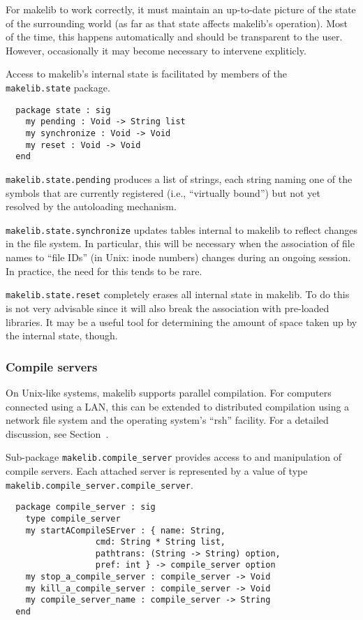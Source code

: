 For makelib to work correctly, it must maintain an up-to-date picture of
the state of the surrounding world (as far as that state affects makelib's
operation).  Most of the time, this happens automatically and should be
transparent to the user.  However, occasionally it may become
necessary to intervene expliticly.

Access to makelib's internal state is facilitated by members of the {\tt
makelib.state} package.

\begin{verbatim}
  package state : sig
    my pending : Void -> String list
    my synchronize : Void -> Void
    my reset : Void -> Void
  end
\end{verbatim}

{\tt makelib.state.pending} produces a list of strings, each string naming
one of the symbols that are currently registered (i.e., ``virtually
bound'') but not yet resolved by the autoloading mechanism.

{\tt makelib.state.synchronize} updates tables internal to makelib to reflect
changes in the file system.  In particular, this will be necessary
when the association of file names to ``file IDs'' (in Unix: inode
numbers) changes during an ongoing session.  In practice, the need for
this tends to be rare.

{\tt makelib.state.reset} completely erases all internal state in makelib.  To
do this is not very advisable since it will also break the association
with pre-loaded libraries.  It may be a useful tool for determining
the amount of space taken up by the internal state, though.

\subsubsection{Compile servers}

On Unix-like systems, makelib supports parallel compilation.  For computers
connected using a LAN, this can be extended to distributed compilation
using a network file system and the operating system's ``rsh''
facility.  For a detailed discussion, see Section~.

Sub-package {\tt makelib.compile_server} provides access to and manipulation
of compile servers.  Each attached server is represented by a value of
type {\tt makelib.compile_server.compile_server}.

\begin{verbatim}
  package compile_server : sig
    type compile_server
    my startACompileSErver : { name: String,
                  cmd: String * String list,
                  pathtrans: (String -> String) option,
                  pref: int } -> compile_server option
    my stop_a_compile_server : compile_server -> Void
    my kill_a_compile_server : compile_server -> Void
    my compile_server_name : compile_server -> String
  end
\end{verbatim}

